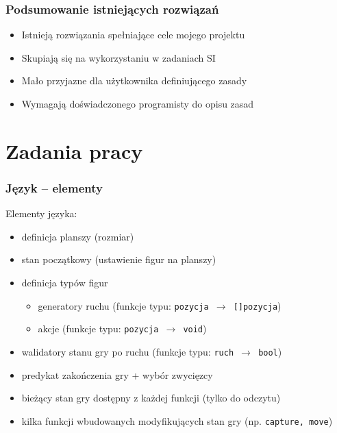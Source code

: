 \documentclass{beamer}
\begin{document}
\begin{frame}
	\frametitle{Podsumowanie istniejących rozwiązań}
	\begin{itemize}
		\item Istnieją rozwiązania spełniające cele mojego projektu
		\item Skupiają się na wykorzystaniu w zadaniach SI
		\item Mało przyjazne dla użytkownika definiującego zasady
		\item Wymagają doświadczonego programisty do opisu zasad
	\end{itemize}
\end{frame}

\section{Zadania pracy}

\begin{frame}
	\frametitle{Język -- elementy}
	Elementy języka:
	\begin{itemize}
		\item definicja planszy (rozmiar)
		\item stan początkowy (ustawienie figur na planszy)
		\item definicja typów figur
		      \begin{itemize}
			      \item generatory ruchu (funkcje typu: {\tt pozycja $\rightarrow$ []pozycja})
			      \item akcje (funkcje typu: {\tt pozycja $\rightarrow$ void})
		      \end{itemize}
		\item walidatory stanu gry po ruchu (funkcje typu: {\tt ruch $\rightarrow$ bool})
		\item predykat zakończenia gry + wybór zwycięzcy
		\item bieżący stan gry dostępny z każdej funkcji (tylko do odczytu)
		\item kilka funkcji wbudowanych modyfikujących stan gry (np. {\tt capture, move})
	\end{itemize}
\end{frame}
\end{document}
